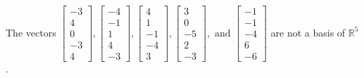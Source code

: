 \begin{exercise}
\begin{exerciseStatement}
  \end{exerciseStatement}
  \begin{exerciseAnswer}
   The vectors \(\left[\begin{array}{r}
-3 \\
4 \\
0 \\
-3 \\
4
\end{array}\right] , \left[\begin{array}{r}
-4 \\
-1 \\
1 \\
4 \\
-3
\end{array}\right] , \left[\begin{array}{r}
4 \\
1 \\
-1 \\
-4 \\
3
\end{array}\right] , \left[\begin{array}{r}
3 \\
0 \\
-5 \\
2 \\
-3
\end{array}\right] , \text{ and } \left[\begin{array}{r}
-1 \\
-1 \\
-4 \\
6 \\
-6
\end{array}\right]\) 
  	 are not  a basis of \(\mathbb{R}^5\).
  


  \end{exerciseAnswer}
\end{exercise}
